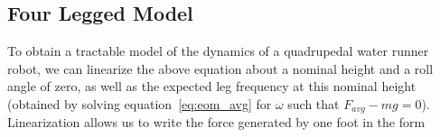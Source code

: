 \subsection{Four Legged Model}
To obtain a tractable model of the dynamics of a quadrupedal water runner robot, we can linearize the above equation about a nominal height and a roll angle of zero, as well as the expected leg frequency at this nominal height (obtained by solving equation~\ref{eq:eom_avg} for $\omega$ such that $F_{avg} - mg = 0$). Linearization allows us to write the force generated by one foot in the form

